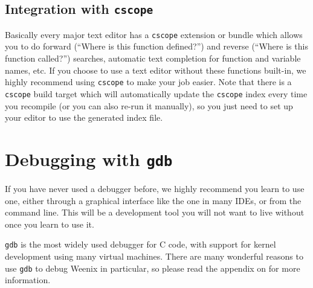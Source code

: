 \subsection{Integration with \texttt{cscope}}

Basically every major text editor has a \texttt{cscope} extension or bundle which allows you to do forward (``Where is this function defined?'') and reverse (``Where is this function called?'') searches, automatic text completion for function and variable names, etc. If you choose to use a text editor without these functions built-in, we highly recommend using \texttt{cscope} to make your job easier. Note that there is a \texttt{cscope} build target which will automatically update the \texttt{cscope} index every time you recompile (or you can also re-run it manually), so you just need to set up your editor to use the generated index file.

\section{Debugging with \texttt{gdb}}

If you have never used a debugger before, we highly recommend you learn to use one, either through a graphical interface like the one in many IDEs, or from the command line. This will be a development tool you will not want to live without once you learn to use it.

\texttt{gdb} is the most widely used debugger for C code, with support for kernel development using many virtual machines. There are many wonderful reasons to use \texttt{gdb} to debug Weenix in particular, so please read the appendix on  for more information.

